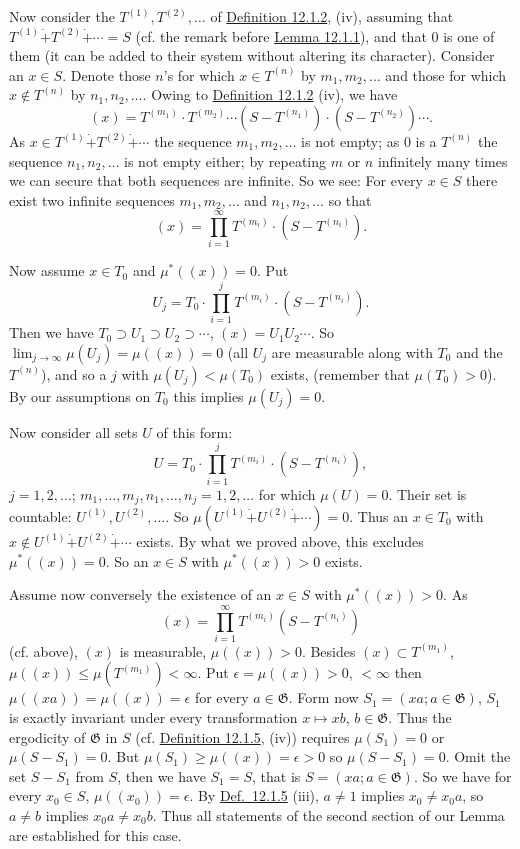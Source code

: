 \documentclass[12pt,b5paper,twoside]{article}
\newcommand{\defref}[1]{\hyperref[def:#1]{Definition #1}}
\newcommand{\lemref}[1]{\hyperref[lem:#1]{Lemma #1}}
\begin{document}
Now consider the $T^{(1)},T^{(2)},\ldots$ of \defref{12.1.2}, (iv), assuming
that $T^{(1)}\mathbin{\dot+}T^{(2)}\mathbin{\dot+}\cdots=S$ (cf. the remark
before \lemref{12.1.1}), and that $0$ is one of them (it can be added to their
system without altering its character). Consider an $x\in S$. Denote those
$n$'s for which $x\in T^{(n)}$ by $m_1,m_2,\ldots$ and those for which
$x\notin T^{(n)}$ by $n_1,n_2,\ldots$. Owing to \defref{12.1.2} (iv), we
have
\[
 (x)=T^{(m_1)}\cdot T^{(m_2)}\cdots
 (S-T^{(n_1)})\cdot(S-T^{(n_2)})\cdots.
\]
As $x\in T^{(1)}\mathbin{\dot+}T^{(2)}\mathbin{\dot+}\cdots$ the sequence
$m_1,m_2,\ldots$ is not empty; as $0$ is a $T^{(n)}$ the sequence
$n_1,n_2,\ldots$ is not empty either; by repeating $m$ or $n$ infinitely many
times we can secure that both sequences are infinite. So we see: For every
$x\in S$ there exist two infinite sequences $m_1,m_2,\ldots$ and
$n_1,n_2,\ldots$ so that
\[
 (x)=\prod_{i=1}^\infty T^{(m_i)}\cdot(S-T^{(n_i)}).
\]

Now assume $x\in T_0$ and $\mu^*((x))=0$. Put
\[
 U_j=T_0\cdot\prod_{i=1}^jT^{(m_i)}\cdot(S-T^{(n_i)}).
\]
Then we have $T_0\supset U_1\supset U_2\supset\cdots$,
$(x)=U_1U_2\cdots$. So $\lim_{j\to\infty}\mu(U_j)=\mu((x))=0$ (all $U_j$
are measurable along with $T_0$ and the $T^{(n)}$), and so a $j$ with
$\mu(U_j)<\mu(T_0)$ exists, (remember that $\mu(T_0)>0$). By our assumptions
on $T_0$ this implies $\mu(U_j)=0$.

Now consider all sets $U$ of this form:
\[
 U=T_0\cdot\prod_{i=1}^jT^{(m_i)}\cdot(S-T^{(n_i)}),
\]
$j=1,2,\ldots$; $m_1,\ldots,m_j,n_1,\ldots,n_j=1,2,\ldots$ for which
$\mu(U)=0$. Their set is countable: $U^{(1)},U^{(2)},\ldots$. So
$\mu(U^{(1)}\mathbin{\dot+}U^{(2)}\mathbin{\dot+}\cdots)=0$. Thus an
$x\in T_0$ with
$x\notin U^{(1)}\mathbin{\dot+}U^{(2)}\mathbin{\dot+}\cdots$ exists. By what
we proved above, this excludes $\mu^*((x))=0$. So an $x\in S$ with
$\mu^*((x))>0$ exists.

Assume now conversely the existence of an $x\in S$ with $\mu^*((x))>0$. As
\[
 (x)=\prod_{i=1}^\infty T^{(m_i)}(S-T^{(n_i)})
\]
(cf. above), $(x)$ is measurable, $\mu((x))>0$. Besides
$(x)\subset T^{(m_1)}$, $\mu((x))\leq\mu(T^{(m_1)})<\infty$. Put
$\epsilon=\mu((x))>0$, $<\infty$ then
$\mu((xa))=\mu((x))=\epsilon$ for every $a\in\mathfrak G$. Form now
$S_1=(xa;a\in\mathfrak G)$, $S_1$ is exactly invariant under every
transformation $x\mapsto xb$, $b\in\mathfrak G$. Thus the ergodicity of
$\mathfrak G$ in $S$ (cf. \defref{12.1.5}, (iv)) requires
$\mu(S_1)=0$ or $\mu(S-S_1)=0$. But
$\mu(S_1)\geq\mu((x))=\epsilon>0$ so $\mu(S-S_1)=0$. Omit the set $S-S_1$
from $S$, then we have $S_1=S$, that is $S=(xa;a\in\mathfrak G)$. So we
 have for every $x_0\in S$, $\mu((x_0))=\epsilon$.
 By \hyperref[def:12.1.5]{Def.~12.1.5} (iii),
$a\neq1$ implies $x_0\neq x_0a$, so $a\neq b$ implies $x_0a\neq x_0b$.
Thus all statements of the second section of our Lemma are established for
this case.
\end{document}

